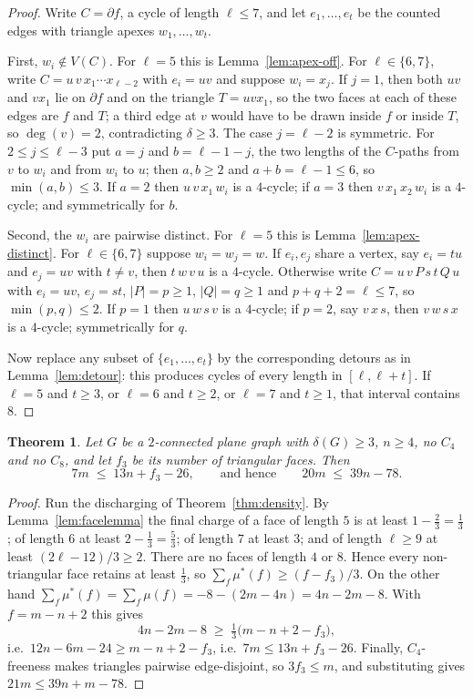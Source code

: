 \documentclass[11pt]{article}
\theoremstyle{plain}
\newtheorem{theorem}{Theorem}
\theoremstyle{definition}
\newcommand{\Cfour}{C_4}
\newcommand{\Ceight}{C_8}
\begin{document}
\begin{proof}
Write $C=\partial f$, a cycle of length $\ell\le7$, and let $e_1,\dots,e_t$ be
the counted edges with triangle apexes $w_1,\dots,w_t$.

First, $w_i\notin V(C)$. For $\ell=5$ this is Lemma~\ref{lem:apex-off}. For
$\ell\in\{6,7\}$, write $C=u\,v\,x_1\cdots x_{\ell-2}$ with $e_i=uv$ and suppose
$w_i=x_j$. If $j=1$, then both $uv$ and $vx_1$ lie on $\partial f$ and on the
triangle $T=uvx_1$, so the two faces at each of these edges are $f$ and $T$; a
third edge at $v$ would have to be drawn inside $f$ or inside $T$, so
$\deg(v)=2$, contradicting $\delta\ge3$. The case $j=\ell-2$ is symmetric. For
$2\le j\le\ell-3$ put $a=j$ and $b=\ell-1-j$, the two lengths of the $C$-paths
from $v$ to $w_i$ and from $w_i$ to $u$; then $a,b\ge2$ and $a+b=\ell-1\le6$, so
$\min(a,b)\le3$. If $a=2$ then $u\,v\,x_1\,w_i$ is a $4$-cycle; if $a=3$ then
$v\,x_1\,x_2\,w_i$ is a $4$-cycle; and symmetrically for $b$.

Second, the $w_i$ are pairwise distinct. For $\ell=5$ this is
Lemma~\ref{lem:apex-distinct}. For $\ell\in\{6,7\}$ suppose $w_i=w_j=w$. If
$e_i,e_j$ share a vertex, say $e_i=tu$ and $e_j=uv$ with $t\ne v$, then
$t\,w\,v\,u$ is a $4$-cycle. Otherwise write $C=u\,v\,P\,s\,t\,Q\,u$ with
$e_i=uv$, $e_j=st$, $|P|=p\ge1$, $|Q|=q\ge1$ and $p+q+2=\ell\le7$, so
$\min(p,q)\le2$. If $p=1$ then $u\,w\,s\,v$ is a $4$-cycle; if $p=2$, say
$v\,x\,s$, then $v\,w\,s\,x$ is a $4$-cycle; symmetrically for $q$.

Now replace any subset of $\{e_1,\dots,e_t\}$ by the corresponding detours as in
Lemma~\ref{lem:detour}: this produces cycles of every length in
$[\ell,\ell+t]$. If $\ell=5$ and $t\ge3$, or $\ell=6$ and $t\ge2$, or $\ell=7$
and $t\ge1$, that interval contains $8$.
\end{proof}

\begin{theorem}\label{thm:sharp}
Let $G$ be a $2$-connected plane graph with $\delta(G)\ge3$, $n\ge4$, no
$\Cfour$ and no $\Ceight$, and let $f_3$ be its number of triangular faces. Then
\[
  7m\;\le\;13n+f_3-26,\qquad\text{and hence}\qquad 20m\;\le\;39n-78 .
\]
\end{theorem}

\begin{proof}
Run the discharging of Theorem~\ref{thm:density}. By Lemma~\ref{lem:facelemma}
the final charge of a face of length $5$ is at least $1-\tfrac23=\tfrac13$; of
length $6$ at least $2-\tfrac13=\tfrac53$; of length $7$ at least $3$; and of
length $\ell\ge9$ at least $(2\ell-12)/3\ge2$. There are no faces of length $4$
or $8$. Hence every non-triangular face retains at least $\tfrac13$, so
$\sum_f\mu^{*}(f)\ge (f-f_3)/3$. On the other hand
$\sum_f\mu^{*}(f)=\sum_f\mu(f)=-8-(2m-4n)=4n-2m-8$. With $f=m-n+2$ this gives
\[
  4n-2m-8\;\ge\;\tfrac13\bigl(m-n+2-f_3\bigr),
\]
i.e.\ $12n-6m-24\ge m-n+2-f_3$, i.e.\ $7m\le13n+f_3-26$. Finally,
$\Cfour$-freeness makes triangles pairwise edge-disjoint, so $3f_3\le m$, and
substituting gives $21m\le39n+m-78$.
\end{proof}
\end{document}
